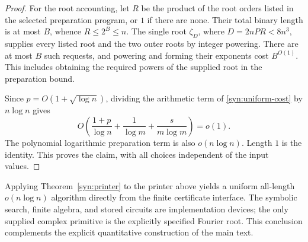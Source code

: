 \begin{proof}
For the root accounting, let $R$ be the product of the root orders
listed in the selected preparation program, or $1$ if there are
none.  Their total binary length is at most $B$, whence
$R\le2^B\le n$.  The single root
$\zeta_D$, where $D=2nPR<8n^3$, supplies every listed root and the
two outer roots by integer powering.  There are at most $B$ such
requests, and powering and forming their exponents cost $B^{O(1)}$.
This includes obtaining the required powers of the supplied root in the
preparation bound.

Since $p=O(1+\sqrt{\log n})$, dividing the arithmetic term of
\eqref{syn:uniform-cost} by $n\log n$ gives
\[
 O\left(\frac{1+p}{\log n}
       +\frac1{\log m}+\frac{s}{m\log m}\right)=o(1).
\]
The polynomial logarithmic preparation term is also $o(n\log n)$.
Length $1$ is the identity.  This proves the claim, with all choices
independent of the input values.
\end{proof}

Applying Theorem~\ref{syn:printer} to the printer above yields a
uniform all-length $o(n\log n)$ algorithm directly from the finite
certificate interface.  The symbolic search, finite algebra, and stored
circuits are implementation devices; the only supplied complex
primitive is the explicitly specified Fourier root.  This conclusion
complements the explicit quantitative construction of the main text.
